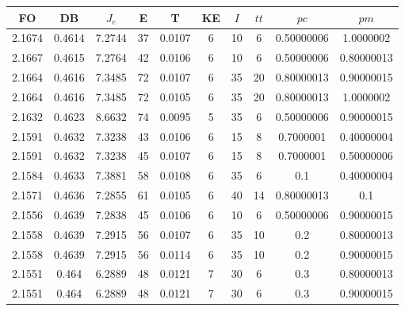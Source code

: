 \begin{table}[h!]
    \footnotesize
    \begin{center}
        \begin{tabular}{|c|c|c|c|c|c|c|c|c|c|}
        \hline
            {\bf FO} & {\bf DB} & $J_e$ & {\bf E} & {\bf T} & {\bf KE} & $I$ & $tt$ & $pc$ & $pm$ \\
        \hline
        \hline
            2.1674 & 0.4614  & 7.2744 & 37 & 0.0107 & 6 & 10 & 6 & 0.50000006 & 1.0000002\\
        \hline
        \hline
            2.1667 & 0.4615  & 7.2764 & 42 & 0.0106 & 6 & 10 & 6 & 0.50000006 & 0.80000013\\
        \hline
        \hline
            2.1664 & 0.4616  & 7.3485 & 72 & 0.0107 & 6 & 35 & 20 & 0.80000013 & 0.90000015\\
        \hline
        \hline
            2.1664 & 0.4616  & 7.3485 & 72 & 0.0105 & 6 & 35 & 20 & 0.80000013 & 1.0000002\\
        \hline
        \hline
            2.1632 & 0.4623  & 8.6632 & 74 & 0.0095 & 5 & 35 & 6 & 0.50000006 & 0.90000015\\
        \hline
        \hline
            2.1591 & 0.4632  & 7.3238 & 43 & 0.0106 & 6 & 15 & 8 & 0.7000001 & 0.40000004\\
        \hline
        \hline
            2.1591 & 0.4632  & 7.3238 & 45 & 0.0107 & 6 & 15 & 8 & 0.7000001 & 0.50000006\\
        \hline
        \hline
            2.1584 & 0.4633  & 7.3881 & 58 & 0.0108 & 6 & 35 & 6 & 0.1 & 0.40000004\\
        \hline
        \hline
            2.1571 & 0.4636  & 7.2855 & 61 & 0.0105 & 6 & 40 & 14 & 0.80000013 & 0.1\\
        \hline
        \hline
            2.1556 & 0.4639  & 7.2838 & 45 & 0.0106 & 6 & 10 & 6 & 0.50000006 & 0.90000015\\
        \hline
        \hline
            2.1558 & 0.4639  & 7.2915 & 56 & 0.0107 & 6 & 35 & 10 & 0.2 & 0.80000013\\
        \hline
        \hline
            2.1558 & 0.4639  & 7.2915 & 56 & 0.0114 & 6 & 35 & 10 & 0.2 & 0.90000015\\
        \hline
        \hline
            2.1551 & 0.464  & 6.2889 & 48 & 0.0121 & 7 & 30 & 6 & 0.3 & 0.80000013\\
        \hline
        \hline
            2.1551 & 0.464  & 6.2889 & 48 & 0.0121 & 7 & 30 & 6 & 0.3 & 0.90000015\\

\end{tabular}
\end{center}
\end{table}
